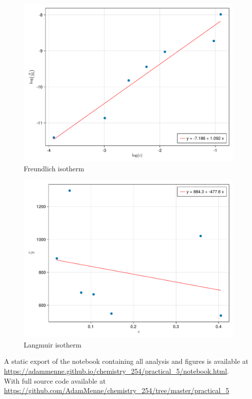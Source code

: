 \documentclass[a4paper, british]{article}
\begin{document}
\begin{figure}[H]
    \centering
    \includegraphics[width=\textwidth]{figures/f1.pdf}
    \caption{Freundlich isotherm}
    \label{fig:f1}
\end{figure}

\begin{figure}[H]
    \centering
    \includegraphics[width=\textwidth]{figures/f2.pdf}
    \caption{Langmuir isotherm}
    \label{fig:f2}
\end{figure}



A static export of the notebook containing all analysis and figures is available at \url{https://adammenne.github.io/chemistry_254/practical_5/notebook.html}.\\ With full source code available at \url{https://github.com/AdamMenne/chemistry_254/tree/master/practical_5}
\end{document}
